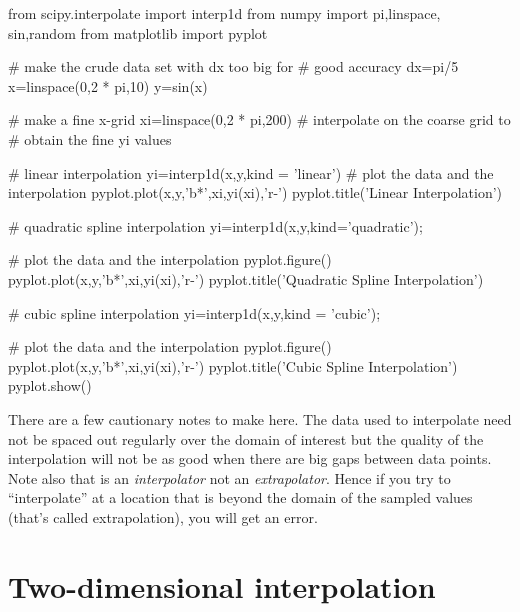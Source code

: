 \begin{codeexample}
\begin{VerbatimOut}{\listingFile}
from scipy.interpolate import interp1d
from numpy import pi,linspace, sin,random
from matplotlib import pyplot

# make the crude data set with dx too big for
# good accuracy
dx=pi/5
x=linspace(0,2 * pi,10)
y=sin(x)

# make a fine x-grid
xi=linspace(0,2 * pi,200)
# interpolate on the coarse grid to
# obtain the fine yi values

# linear interpolation
yi=interp1d(x,y,kind = 'linear')
# plot the data and the interpolation
pyplot.plot(x,y,'b*',xi,yi(xi),'r-')
pyplot.title('Linear Interpolation')

# quadratic spline interpolation
yi=interp1d(x,y,kind='quadratic');

# plot the data and the interpolation
pyplot.figure()
pyplot.plot(x,y,'b*',xi,yi(xi),'r-')
pyplot.title('Quadratic Spline Interpolation')

# cubic spline interpolation
yi=interp1d(x,y,kind = 'cubic');

# plot the data and the interpolation
pyplot.figure()
pyplot.plot(x,y,'b*',xi,yi(xi),'r-')
pyplot.title('Cubic Spline Interpolation')
pyplot.show()
\end{VerbatimOut}
\end{codeexample}
There are a few cautionary notes to make here.  The data used to
interpolate need not be spaced out regularly over the domain of
interest but the quality of the interpolation will not be as good when
there are big gaps between data points.  Note also that
 is an {\it interpolator} not an {\it extrapolator}.
Hence if you try to ``interpolate'' at a location that is beyond the
domain of the sampled values (that's called extrapolation), you will
get an error.


\section{Two-dimensional interpolation}

